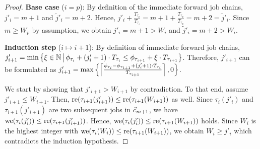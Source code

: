\documentclass[10pt,conference]{resources/IEEEtran}
\theoremstyle{definition}
\newcommand{\fc}{\fw{c}}
\begin{document}
\begin{proof}
	\textbf{Base case} ($i=p$):
	By definition of the immediate forward job chains, $j'_i = m+1 $ and $\tilde{j}'_i = m+2$.
	Hence, $j'_i + \frac{T_{\tau_p}}{T_{\tau_i}} = m +1 + \frac{T_{\tau_p}}{T_{\tau_p}} = m+2 = \tilde{j}'_i$.
	Since $m \geq W_p$ by assumption, we obtain $j'_i = m+1 > W_i$ and $\tilde{j}'_i = m+2 > W_i$.

	\textbf{Induction step} ($i \mapsto i+1$):
	By definition of immediate forward job chains, 
	$j'_{i+1} = \min \left\{\xi \in \mathbb{N} \,\middle|\, \phi_{\tau_i} + (j'_i +1) \cdot T_{\tau_i} \leq \phi_{\tau_{i+1}} + \xi \cdot T_{\tau_{i+1}}\right\}$.
	Therefore, $j'_{i+1}$ can be formulated as 
	$j'_{i+1} = \max\left\{{\left\lceil{\frac{\phi_{\tau_i} - \phi_{\tau_{i+1}} + (j'_i+1) \cdot T_{\tau_i}}{T_{\tau_{i+1}}}}\right\rceil , 0}\right\}$.
	
	We start by showing that $j'_{i+1}>W_{i+1}$ by contradiction.
	To that end, assume $j'_{i+1} \leq W_{i+1}$.
	Then, $\operatorname{re}(\tau_{i+1}(j'_{i+1})) \leq \operatorname{re}(\tau_{i+1}(W_{i+1}))$ as well.
	Since $\tau_i(j'_i)$ and $\tau_{i+1}(j'_{i+1})$ are two subsequent jobs in $\fc_{m+1}$, we have $\operatorname{we}(\tau_i(j'_i)) \leq \operatorname{re}(\tau_{i+1}(j'_{i+1}))$.
	Hence, $\operatorname{we}(\tau_i(j'_i)) \leq \operatorname{re}(\tau_{i+1}(W_{i+1}))$ holds.
	Since $W_i$ is the highest integer with $\operatorname{we}(\tau_i(W_i)) \leq \operatorname{re}(\tau_{i+1}(W_{i+1}))$, we obtain $W_i \geq j'_i$ which contradicts the induction hypothesis.


\end{proof}
\end{document}
